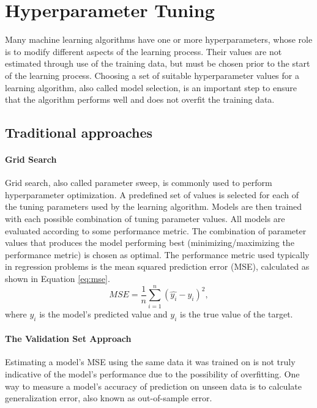 \chapter{Hyperparameter Tuning}
Many machine learning algorithms have one or more hyperparameters, whose role is to modify different aspects of the learning process. Their values are not estimated through use of the training data, but must be chosen prior to the start of the learning process. Choosing a set of suitable hyperparameter values for a learning algorithm, also called model selection, is an important step to ensure that the algorithm performs well and does not overfit the training data.

\section{Traditional approaches} \label{sec:trad_tuning}

\subsubsection{Grid Search}
Grid search, also called parameter sweep, is commonly used to perform hyperparameter optimization. A predefined set of values is selected for each of the tuning parameters used by the learning algorithm. Models are then trained with each possible combination of tuning parameter values. All models are evaluated according to some performance metric. The combination of parameter values that produces the model performing best (minimizing/maximizing the performance metric) is chosen as optimal. The performance metric used typically in regression problems is the mean squared prediction error (MSE), calculated as shown in Equation \ref{eq:mse}.
\begin{equation} \label{eq:mse}
MSE = \frac{1}{n} \sum_{i=1}^{n} (\hat{y_i}-y_i)^2, 
\end{equation}
where $\hat{y_i}$ is the model's predicted value and $y_i$ is the true value of the target. 

\subsubsection{The Validation Set Approach}
Estimating a model's MSE using the same data it was trained on is not truly indicative of the model's performance due to the possibility of overfitting. One way to measure a model's accuracy of prediction on unseen data is to calculate generalization error, also known as out-of-sample error. 

